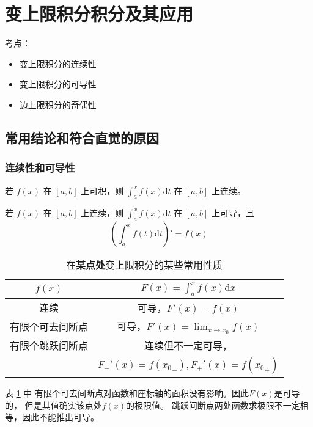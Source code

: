 \section{变上限积分积分及其应用}

考点：
\begin{itemize}
    \item 变上限积分的连续性
    \item 变上限积分的可导性
    \item 边上限积分的奇偶性
\end{itemize}

\subsection{常用结论和符合直觉的原因}

\subsubsection{连续性和可导性}

\begin{theorem}
    若 $f(x)$ 在 $[a, b]$ 上可积，则 $\int_a^x f(x) \mathrm{d} t$
    在 $[a, b]$ 上连续。
\end{theorem}

\begin{theorem}
    若 $f(x)$ 在 $[a, b]$ 上连续，则 $\int_a^x f(x) \mathrm{d} t$
    在 $[a, b]$ 上可导，且
    \[
        \left(\int_a^x f(t) \mathrm{d}t\right)' = f(x)
    \]
\end{theorem}

\begin{table}
    \centering
    \begin{tabular}{cc}
        \toprule
        $f(x)$ & $F(x) = \int_a^x f(x) \mathrm{d}x$ \\
        \midrule
        连续             & 可导，$F'(x) = f(x)$ \\
        有限个可去间断点 & 可导，$F'(x) = \lim_{x \to x_0} f(x)$\\
        有限个跳跃间断点 & 连续但不一定可导，\\
        {}&$F_{-}'(x) = f({x_0}_{-}), F_{+}'(x) = f({x_0}_{+})$ \\
        \bottomrule
    \end{tabular}
    \caption{在\textbf{某点处}变上限积分的某些常用性质}
    \label{tab:useful-properoties-of-variable-limits-integral}
\end{table}

表 \ref{tab:useful-properoties-of-variable-limits-integral} 中
有限个可去间断点对函数和座标轴的面积没有影响。因此$F(x)$是可导的，
但是其值确实该点处$f(x)$的极限值。
跳跃间断点两处函数求极限不一定相等，因此不能推出可导。

